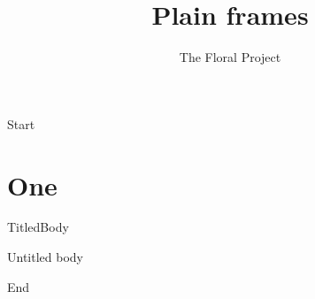 \documentclass[aspectratio=169]{beamer}
\title{Plain frames}
\author{The Floral Project}
\date{}
\begin{document}
\begin{frame}[plain]Start\end{frame}
\begin{frame}[plain]\titlepage\end{frame}
\section{One}
\begin{frame}{Titled}Body\end{frame}
\begin{frame}Untitled body\end{frame}
\begin{frame}[plain]End\end{frame}
\end{document}
